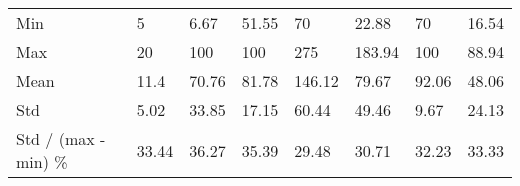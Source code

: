\begin{tabular}{llllllll}
Min                 &         5 &                      6.67 &                      51.55 &                          70 &                   22.88 &                    70 &               16.54 \\
Max                 &        20 &                       100 &                        100 &                         275 &                  183.94 &                   100 &               88.94 \\
Mean                &      11.4 &                     70.76 &                      81.78 &                      146.12 &                   79.67 &                 92.06 &               48.06 \\
Std                 &      5.02 &                     33.85 &                      17.15 &                       60.44 &                   49.46 &                  9.67 &               24.13 \\
Std / (max - min) \% &     33.44 &                     36.27 &                      35.39 &                       29.48 &                   30.71 &                 32.23 &               33.33 \\
\bottomrule
\end{tabular}
